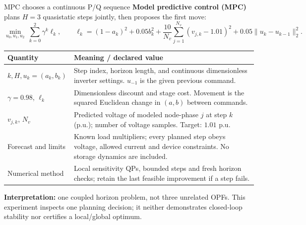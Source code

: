 \begin{frame}[t]{MPC chooses a continuous P/Q sequence}
\setlength{\parskip}{0pt}
\setlength{\abovedisplayskip}{5pt}\setlength{\belowdisplayskip}{5pt}
\small
\textbf{Model predictive control (MPC)} plans $H=3$ quasistatic steps jointly, then proposes the first move:
\[
\min_{u_0,u_1,u_2}\ \sum_{k=0}^{2}\gamma^k\ell_k,\qquad
\ell_k=(1-a_k)^2+0.05b_k^2+
\frac{10}{N_v}\sum_{j=1}^{N_v}(v_{j,k}-1.01)^2+0.05\|u_k-u_{k-1}\|_2^2 .
\]
\footnotesize
\renewcommand{\arraystretch}{1.02}
\begin{tabular}{@{}>{\raggedright\arraybackslash}p{.26\linewidth}>{\raggedright\arraybackslash}p{.66\linewidth}@{}}
\toprule Quantity & Meaning / declared value \\
\midrule
$k,H,u_k=(a_k,b_k)$ & Step index, horizon length, and continuous dimensionless inverter settings. $u_{-1}$ is the given previous command. \\
$\gamma=0.98$, $\ell_k$ & Dimensionless discount and stage cost. Movement is the squared Euclidean change in $(a,b)$ between commands. \\
$v_{j,k}$, $N_v$ & Predicted voltage of modeled node-phase $j$ at step $k$ (p.u.); number of voltage samples. Target: $1.01$ p.u. \\
Forecast and limits & Known load multipliers; every planned step obeys voltage, allowed current and device constraints. No storage dynamics are included. \\
Numerical method & Local sensitivity QPs, bounded steps and fresh horizon checks; retain the last feasible improvement if a step fails. \\
\bottomrule
\end{tabular}
\par\textbf{Interpretation:} one coupled horizon problem, not three unrelated OPFs. This experiment inspects one planning decision; it neither demonstrates closed-loop stability nor certifies a local/global optimum.
\end{frame}

